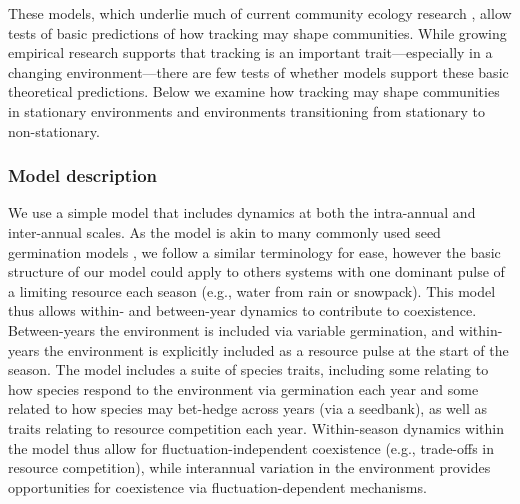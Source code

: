 \documentclass[11pt,letterpaper]{article}
\begin{document}
These models, which underlie much of current community ecology research \citep{Mayfield:2010fe,barabas2018,ellner2019}, allow tests of basic predictions of how tracking may shape communities. While growing empirical research supports that tracking is an important trait---especially in a changing environment---there are few tests of whether models support these basic theoretical predictions. Below we examine how tracking may shape communities in stationary environments and environments transitioning from stationary to non-stationary.

\subsubsection{Model description}
We use a simple model that includes dynamics at both the intra-annual and inter-annual scales. As the model is akin to many commonly used seed germination models \citep{Chesson:2004eo}, we follow a similar terminology for ease, however the basic structure of our model could apply to others systems with one dominant pulse of a limiting resource each season (e.g., water from rain or snowpack).  This model thus allows within- and between-year dynamics to contribute to coexistence. Between-years the environment is included via variable germination, and within-years the environment is explicitly included as a resource pulse at the start of the season. The model includes a suite of species traits, including some relating to how species respond to the environment via germination each year and some related to how species may bet-hedge across years (via a seedbank), as well as traits relating to resource competition each year. Within-season dynamics within the model thus allow for fluctuation-independent coexistence (e.g., trade-offs in resource competition), while interannual variation in the environment provides opportunities for coexistence via fluctuation-dependent mechanisms. 

\end{document}
